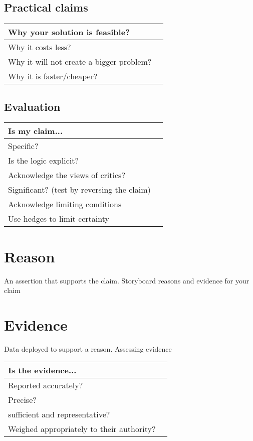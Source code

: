 \documentclass[10pt, a4paper]{article}
\begin{document}
	\subsection{Practical claims}
	\begin{center}
		\begin{tabular}{|l |l|}
			\hline
			Why your solution is feasible? &\\
			\hline
			Why it costs less?&\\
			\hline
			Why it will not create a bigger problem?&\\
			\hline
			Why it is faster/cheaper?&\\
			\hline
		\end{tabular}
	\end{center}
	\subsection{Evaluation}
		\begin{center}
		\begin{tabular}{|l |l|}
			\hline
			Is my claim... &\\
			\hline
			Specific?&\\
			\hline
			Is the logic explicit?&\\
			\hline
			Acknowledge the views of critics?&\\
			\hline
			Significant? (test by reversing the claim)&\\
			\hline
			Acknowledge limiting conditions&\\
			\hline
			Use hedges to limit certainty&\\
			\hline
		\end{tabular}
	\end{center}
	\section{Reason}
	An assertion that supports the claim. 
	Storyboard reasons and evidence for your claim
	\section{Evidence}
	Data deployed to support a reason.	Assessing evidence
	\begin{center}
		\begin{tabular}{|l |l|}
			\hline
			Is the evidence...&\\
			\hline
			Reported accurately?&\\
			\hline
			Precise?&\\
			\hline
			sufficient and representative?&\\
			\hline
			Weighed appropriately to their authority? &\\
			\hline
		\end{tabular}
	\end{center}
\end{document}
